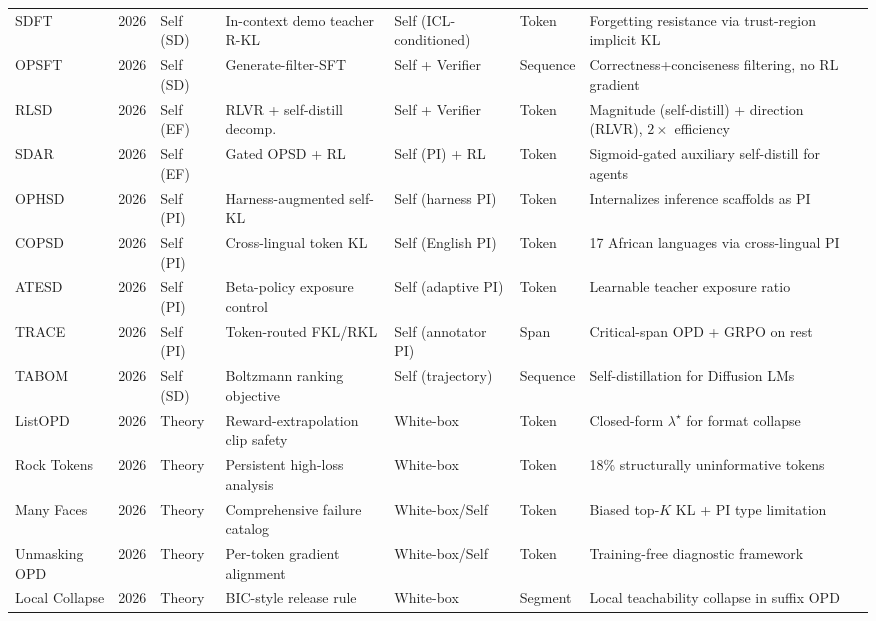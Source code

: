 \documentclass{article} %
\begin{document}
\begin{table}[t]
{\begin{tabular}{@{}lclllll@{}}
        SDFT \citep{2601.19897} & 2026 & Self (SD) & In-context demo teacher R-KL & Self (ICL-conditioned) & Token & Forgetting resistance via trust-region implicit KL \\
        OPSFT \citep{2602.13407} & 2026 & Self (SD) & Generate-filter-SFT & Self + Verifier & Sequence & Correctness+conciseness filtering, no RL gradient \\
        RLSD \citep{2604.03128} & 2026 & Self (EF) & RLVR + self-distill decomp. & Self + Verifier & Token & Magnitude (self-distill) + direction (RLVR), $2\times$ efficiency \\
        SDAR \citep{2605.15155} & 2026 & Self (EF) & Gated OPSD + RL & Self (PI) + RL & Token & Sigmoid-gated auxiliary self-distill for agents \\
        OPHSD \citep{2605.08741} & 2026 & Self (PI) & Harness-augmented self-KL & Self (harness PI) & Token & Internalizes inference scaffolds as PI \\
        COPSD \citep{2605.09548} & 2026 & Self (PI) & Cross-lingual token KL & Self (English PI) & Token & 17 African languages via cross-lingual PI \\
        ATESD \citep{2605.11458} & 2026 & Self (PI) & Beta-policy exposure control & Self (adaptive PI) & Token & Learnable teacher exposure ratio \\
        TRACE \citep{2605.10194} & 2026 & Self (PI) & Token-routed FKL/RKL & Self (annotator PI) & Span & Critical-span OPD + GRPO on rest \\
        TABOM \citep{2605.11854} & 2026 & Self (SD) & Boltzmann ranking objective & Self (trajectory) & Sequence & Self-distillation for Diffusion LMs \\
        ListOPD \citep{2605.08737} & 2026 & Theory & Reward-extrapolation clip safety & White-box & Token & Closed-form $\lambda^\star$ for format collapse \\
        Rock Tokens \citep{2605.09253} & 2026 & Theory & Persistent high-loss analysis & White-box & Token & 18\% structurally uninformative tokens \\
        Many Faces \citep{2605.11182} & 2026 & Theory & Comprehensive failure catalog & White-box/Self & Token & Biased top-$K$ KL + PI type limitation \\
        Unmasking OPD \citep{2605.10889} & 2026 & Theory & Per-token gradient alignment & White-box/Self & Token & Training-free diagnostic framework \\
        Local Collapse \citep{2605.13643} & 2026 & Theory & BIC-style release rule & White-box & Segment & Local teachability collapse in suffix OPD \\

\end{tabular}}
\end{table}
\end{document}
